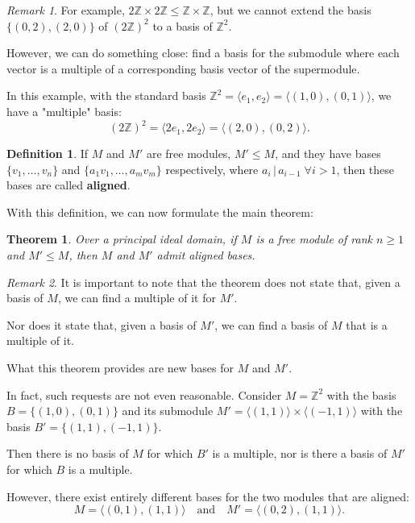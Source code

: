\documentclass{article}
\newif\ifusemulticols
\newcommand\newterm[1]{\textbf{#1}}
\theoremstyle{definition}
\newtheorem{deff}{Definition}
\theoremstyle{remark}
\newtheorem*{note}{Remark}
\theoremstyle{plain}
\newtheorem{theorem}{Theorem}
\theoremstyle{plain}
\newenvironment{mymulticols}
    { \ifusemulticols \begin{multicols}{2} \fi }
    { \ifusemulticols \end{multicols} \fi }
\newcommand{\Z}{\mathbb{Z}}
\begin{document}
\begin{mymulticols}
\begin{note}
    For example, $2\Z \times 2\Z \le \Z \times \Z$, but we cannot extend the basis $\{(0, 2), (2,
    0)\}$ of $(2\Z)^2$ to a basis of $\Z^2$.

    However, we can do something close: find a basis for the submodule where each vector is a
    multiple of a corresponding basis vector of the supermodule.

    In this example, with the standard basis $\Z^2 = \langle e_1, e_2 \rangle = \langle (1,0), (0,1)
    \rangle$, we have a "multiple" basis:
    $$(2\Z)^2 = \langle 2e_1, 2e_2 \rangle = \langle (2,0), (0,2) \rangle.$$
\end{note}

\begin{deff}
    If $M$ and $M'$ are free modules, $M' \le M$, and they have bases $\{v_1, \ldots, v_n\}$ and
    $\{a_1 v_1, \ldots, a_m v_m\}$ respectively, where $a_i \,|\, a_{i-1} \; \forall i > 1$, then
    these bases are called \newterm{aligned}.
\end{deff}

With this definition, we can now formulate the main theorem:

\begin{theorem}
    \label{prop:aligned_bases}
    Over a principal ideal domain, if $M$ is a free module of rank $n \geq 1$ and $M' \le M$, then
    $M$ and $M'$ admit aligned bases.
\end{theorem}

\begin{note}
    It is important to note that the theorem does not state that, given a basis of $M$, we can find
    a multiple of it for $M'$.

    Nor does it state that, given a basis of $M'$, we can find a basis of $M$ that is a multiple of it.

    What this theorem provides are \quotedblbase new\quotedblright{} bases for $M$ and $M'$.

    In fact, such requests are not even reasonable. Consider $M = \Z^2$ with the basis $B = \{(1,0),
    (0,1)\}$ and its submodule $M' = \langle (1,1) \rangle \times \langle (-1, 1) \rangle$ with the
    basis $B' = \{(1,1), (-1,1)\}$.

    Then there is no basis of $M$ for which $B'$ is a multiple, nor is there a basis of $M'$ for
    which $B$ is a multiple.

    However, there exist entirely different bases for the two modules that are aligned:
    $$M = \langle (0,1), (1,1) \rangle \quad \text{and} \quad M' = \langle (0,2), (1,1) \rangle.$$
\end{note}


\end{mymulticols}
\end{document}
